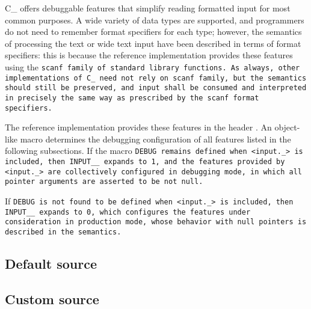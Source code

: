 \def\Subsection#1{\subsection{#1}}

C\_ offers debuggable features that simplify
reading formatted input for most common purposes.
A wide variety of data types are supported, and programmers do not need to
remember format specifiers for each type; however, the semantics of processing
the text or wide text input have been described in terms of format specifiers:
this is because the reference implementation provides these
features using the \tt{scanf} family of standard library functions.
As always, other implementations of C\_ need not rely on \tt{scanf} family,
but the semantics should still be preserved,
and input shall be consumed and interpreted in precisely the
same way as prescribed by the \tt{scanf} format specifiers.

The reference implementation provides these features in the header .
An object-like macro  determines the debugging
configuration of all features listed in the following subsections.
If the macro \tt{DEBUG} remains defined when \tt{<input._>} is included,
then \tt{INPUT__} expands to \tt{1}, and the features provided
by \tt{<input._>} are collectively configured in debugging mode,
in which all pointer arguments are asserted to be not null.

If \tt{DEBUG} is not found to be defined when \tt{<input._>} is included,
then \tt{INPUT__} expands to \tt{0},
which configures the features under consideration in production mode,
whose behavior with null pointers is described in the semantics.

\Subsection{Default source}

\Subsection{Custom  source}
